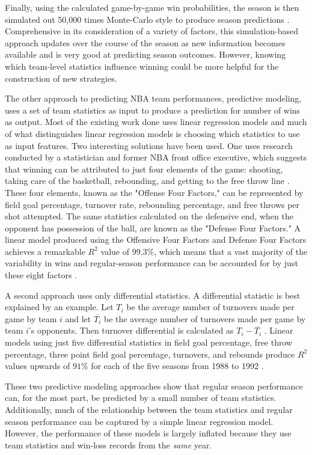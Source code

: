 \documentclass[pageno]{jpaper}
\begin{document}
Finally, using the calculated game-by-game win probabilities, the season is then simulated out 50,000 times Monte-Carlo style to produce season predictions \cite{538pred}. Comprehensive in its consideration of a variety of factors, this simulation-based approach updates over the course of the season as new information becomes available and is very good at predicting season outcomes. However, knowing which team-level statistics influence winning could be more helpful for the construction of new strategies.

The other approach to predicting NBA team performances, predictive modeling, uses a set of team statistics as input to produce a prediction for number of wins as output. Most of the existing work done uses linear regression models and much of what distinguishes linear regression models is choosing which statistics to use as input features. Two interesting solutions have been used. One uses research conducted by a statistician and former NBA front office executive, which suggests that winning can be attributed to just four elements of the game: shooting, taking care of the basketball, rebounding, and getting to the free throw line \cite{fourfactors}. These four elements, known as the "Offense Four Factors," can be represented by field goal percentage, turnover rate, rebounding percentage, and free throws per shot attempted. The same statistics calculated on the defensive end, when the opponent has possession of the ball, are known as the "Defense Four Factors." A linear model produced using the Offensive Four Factors and Defense Four Factors achieves a remarkable $R^2$ value of $99.3\%$, which means that a vast majority of the variability in wins and regular-season performance can be accounted for by just these eight factors \cite{fourfactors}.

A second approach uses only differential statistics. A differential statistic is best explained by an example. Let $T_i$ be the average number of turnovers made per game by team $i$ and let $\overline{T_i}$ be the average number of turnovers made per game by team $i$'s opponents. Then turnover differential is calculated as $T_i - \overline{T_i}$ \cite{takethatjam}. Linear models using just five differential statistics in field goal percentage, free throw percentage, three point field goal percentage, turnovers, and rebounds produce $R^2$ values upwards of $91\%$ for each of the five seasons from 1988 to 1992 \cite{takethatjam}.

These two predictive modeling approaches show that regular season performance can, for the most part, be predicted by a small number of team statistics. Additionally, much of the relationship between the team statistics and regular season performance can be captured by a simple linear regression model. However, the performance of these models is largely inflated because they use team statistics and win-loss records from the \textit{same} year.
\end{document}
